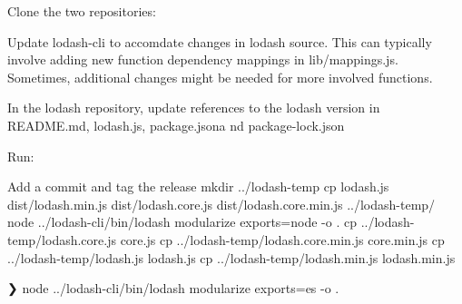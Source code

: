 \begin{DoxyEnumerate}
\item Clone the two repositories\+: 
\begin{DoxyCode}{0}

\end{DoxyCode}

\item Update lodash-\/cli to accomdate changes in lodash source. This can typically involve adding new function dependency mappings in lib/mappings.\+js. Sometimes, additional changes might be needed for more involved functions.
\item In the lodash repository, update references to the lodash version in README.\+md, lodash.\+js, package.\+jsona nd package-\/lock.\+json
\item Run\+: 
\begin{DoxyCode}{0}

\end{DoxyCode}

\item Add a commit and tag the release mkdir ../lodash-\/temp cp lodash.\+js dist/lodash.\+min.\+js dist/lodash.\+core.\+js dist/lodash.\+core.\+min.\+js ../lodash-\/temp/ node ../lodash-\/cli/bin/lodash modularize exports=node -\/o . cp ../lodash-\/temp/lodash.core.\+js core.\+js cp ../lodash-\/temp/lodash.core.\+min.\+js core.\+min.\+js cp ../lodash-\/temp/lodash.js lodash.\+js cp ../lodash-\/temp/lodash.min.\+js lodash.\+min.\+js
\end{DoxyEnumerate}

❯ node ../lodash-\/cli/bin/lodash modularize exports=es -\/o . 